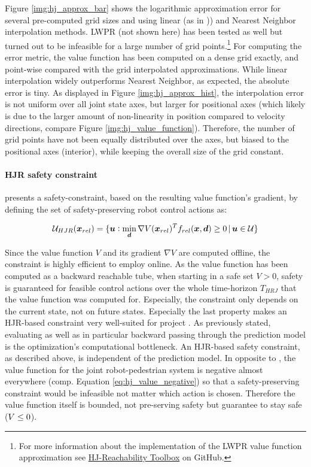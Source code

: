 Figure \ref{img:hj_approx_bar} shows the logarithmic approximation error for several pre-computed grid sizes and using linear (as in \cite{Leung2020})) and Nearest Neighbor interpolation methods. LWPR (not shown here) has been tested as well but turned out to be infeasible for a large number of grid points.\footnote{For more information about the implementation of the LWPR value function approximation see \href{https://github.com/simon-schaefer/HJReachibility}{HJ-Reachability Toolbox} on GitHub.} For computing the error metric, the value function has been computed on a dense grid exactly, and point-wise compared with the grid interpolated approximations. While linear interpolation widely outperforms Nearest Neighbor, as expected, the absolute error is tiny. As displayed in Figure \ref{img:hj_approx_hist}, the interpolation error is not uniform over all joint state axes, but larger for positional axes (which likely is due to the larger amount of non-linearity in position compared to velocity directions, compare Figure \ref{img:hj_value_function}). Therefore, the number of grid points have not been equally distributed over the axes, but biased to the positional axes (interior), while keeping the overall size of the grid constant.

\paragraph{\ac{HJR} safety constraint}
\cite{Leung2020} presents a safety-constraint, based on the resulting value function's gradient, by defining the set of safety-preserving robot control actions as:

\begin{equation}
\mathcal{U}_{HJR} (\boldsymbol{x}_{rel}) = \{ \boldsymbol{u}: \min_{\boldsymbol{d}} \nabla V (\boldsymbol{x}_{rel})^T f_{rel}(\boldsymbol{x}, \boldsymbol{d}) \geq 0 \, | \, \boldsymbol{u} \in \mathcal{U} \}
\end{equation}

Since the value function $V$ and its gradient $\nabla V$ are computed offline, the constraint is highly efficient to employ online. As the value function has been computed as a backward reachable tube, when starting in a safe set $V > 0$, safety is guaranteed for feasible control actions over the whole time-horizon $T_{HRJ}$ that the value function was computed for. Especially, the constraint only depends on the current state, not on future states. Especially the last property makes an \ac{HJR}-based constraint very well-suited for project \project. As previously stated, evaluating as well as in particular backward passing through the prediction model is the optimization's computational bottleneck. An \ac{HJR}-based safety constraint, as described above, is independent of the prediction model.
\newline
In opposite to \cite{Leung2020}, the value function for the joint robot-pedestrian system is negative almost everywhere (comp. Equation \ref{eq:hj_value_negative}) so that a safety-preserving constraint would be infeasible not matter which action is chosen. Therefore the value function itself is bounded, not pre-serving safety but guarantee to stay safe ($V \leq 0$).

